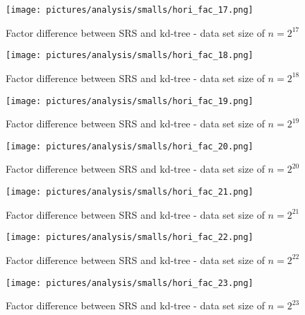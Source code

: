\clearpage

\begin{figure}[h]
    \centering
    \texttt{[image: pictures/analysis/smalls/hori\_fac\_17.png]}
    \caption{Factor difference between SRS and kd-tree - data set size of $n=2^{17}$}\label{fig:small_hori_fac_17}
\end{figure}

\begin{figure}[h]
    \centering
    \texttt{[image: pictures/analysis/smalls/hori\_fac\_18.png]}
    \caption{Factor difference between SRS and kd-tree - data set size of $n=2^{18}$}\label{fig:small_hori_fac_18}
\end{figure}

\begin{figure}[h]
    \centering
    \texttt{[image: pictures/analysis/smalls/hori\_fac\_19.png]}
    \caption{Factor difference between SRS and kd-tree - data set size of $n=2^{19}$}\label{fig:small_hori_fac_19}
\end{figure}

\begin{figure}[h]
    \centering
    \texttt{[image: pictures/analysis/smalls/hori\_fac\_20.png]}
    \caption{Factor difference between SRS and kd-tree - data set size of $n=2^{20}$}\label{fig:small_hori_fac_20}
\end{figure}

\begin{figure}[h]
    \centering
    \texttt{[image: pictures/analysis/smalls/hori\_fac\_21.png]}
    \caption{Factor difference between SRS and kd-tree - data set size of $n=2^{21}$}\label{fig:small_hori_fac_21}
\end{figure}

\begin{figure}[h]
    \centering
    \texttt{[image: pictures/analysis/smalls/hori\_fac\_22.png]}
    \caption{Factor difference between SRS and kd-tree - data set size of $n=2^{22}$}\label{fig:small_hori_fac_22}
\end{figure}

\begin{figure}[h]
    \centering
    \texttt{[image: pictures/analysis/smalls/hori\_fac\_23.png]}
    \caption{Factor difference between SRS and kd-tree - data set size of $n=2^{23}$}\label{fig:small_hori_fac_23}
\end{figure}


